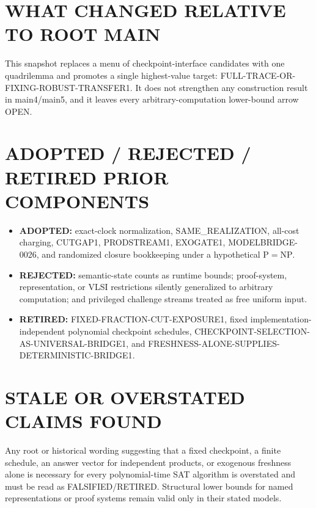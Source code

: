 \documentclass[11pt]{article}
\newcommand{\OPEN}{\textsf{OPEN}}
\newcommand{\RET}{\textsf{FALSIFIED/RETIRED}}
\begin{document}
\section*{WHAT CHANGED RELATIVE TO ROOT MAIN}
This snapshot replaces a menu of checkpoint-interface candidates with one
quadrilemma and promotes a single highest-value target:
\textsf{FULL-TRACE-OR-FIXING-ROBUST-TRANSFER1}.  It does not strengthen any
construction result in main4/main5, and it leaves every arbitrary-computation
lower-bound arrow \OPEN{}.

\section*{ADOPTED / REJECTED / RETIRED PRIOR COMPONENTS}
\begin{itemize}
\item \textbf{ADOPTED:} exact-clock normalization, SAME\_REALIZATION, all-cost
charging, CUTGAP1, PRODSTREAM1, EXOGATE1, MODELBRIDGE-0026, and randomized
closure bookkeeping under a hypothetical $\mathrm{P}=\mathrm{NP}$.
\item \textbf{REJECTED:} semantic-state counts as runtime bounds; proof-system,
representation, or VLSI restrictions silently generalized to arbitrary
computation; and privileged challenge streams treated as free uniform input.
\item \textbf{RETIRED:} \textsf{FIXED-FRACTION-CUT-EXPOSURE1}, fixed
implementation-independent polynomial checkpoint schedules,
\textsf{CHECKPOINT-SELECTION-AS-UNIVERSAL-BRIDGE1}, and
\textsf{FRESHNESS-ALONE-SUPPLIES-DETERMINISTIC-BRIDGE1}.
\end{itemize}

\section*{STALE OR OVERSTATED CLAIMS FOUND}
Any root or historical wording suggesting that a fixed checkpoint, a finite
schedule, an answer vector for independent products, or exogenous freshness
alone is necessary for every polynomial-time SAT algorithm is overstated and
must be read as \RET{}.  Structural lower bounds for named representations or
proof systems remain valid only in their stated models.
\end{document}
